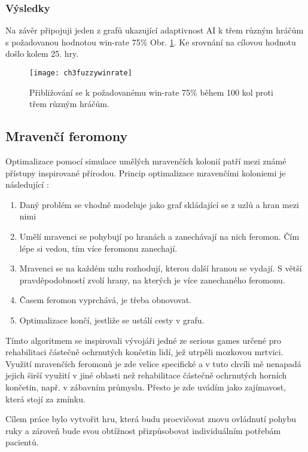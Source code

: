 \subsubsection{Výsledky}

Na závěr připojuji jeden z grafů ukazující adaptivnost AI k třem různým hráčům s požadovanou hodnotou win-rate 75\% Obr. \ref{fig-ch3fuzzywinrate}. Ke srovnání na cílovou hodnotu došlo kolem 25. hry. 

\begin{figure}
  \centering
  \texttt{[image: ch3fuzzywinrate]}
	\caption{Přibližování se k požadovanému win-rate 75\% během 100 kol proti třem různým hráčům. \cite{25deadend} }
	\label{fig-ch3fuzzywinrate}
\end{figure}

\subsection{Mravenčí feromony}

Optimalizace pomocí simulace umělých mravenčích kolonií patří mezi známé přístupy inspirované přírodou. Princip optimalizace mravenčími koloniemi je následující :


\begin{enumerate}
	\item Daný problém se vhodně modeluje jako graf skládající se z uzlů a hran mezi nimi
	\item Umělí mravenci se pohybují po hranách a zanechávají na nich feromon. Čím lépe si vedou, tím více feromonu zanechají.
	\item Mravenci se na každém uzlu rozhodují, kterou další hranou se vydají. S větší pravděpodobností zvolí hrany, na kterých je více zanechaného feromonu.
	\item Časem feromon vyprchává, je třeba obnovovat.
	\item Optimalizace končí, jestliže se ustálí cesty v grafu. 
\end{enumerate}

Tímto algoritmem se inspirovali vývojáři jedné ze serious games určené pro rehabilitaci částečně ochrnutých končetin lidí, jež utrpěli mozkovou mrtvici\cite{26poststroke}. Využití mravenčích feromonů je zde velice specifické a v tuto chvíli mě nenapadá jejich širší využití v jiné oblasti než rehabilitace částečně ochrnutých horních končetin, např. v zábavním průmyslu. Přesto je zde uvádím jako zajímavost, která stojí za zmínku.

Cílem práce bylo vytvořit hru, která budu procvičovat znovu ovládnutí pohybu ruky a zároveň bude svou obtížnost přizpůsobovat individuálním potřebám pacientů.

